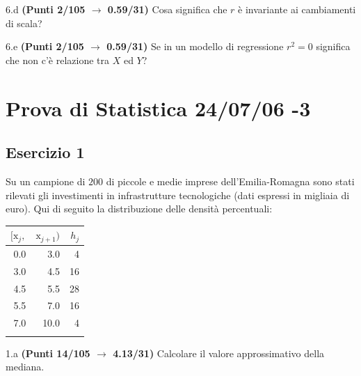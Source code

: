 \documentclass[
  11pt,
]{book}
\theoremstyle{mytheoremstyle}
\theoremstyle{mydefstyle}
\begin{document}
6.d \textbf{(Punti 2/105 \(\rightarrow\) 0.59/31)} Cosa significa che \(r\) è invariante ai cambiamenti di scala?

6.e \textbf{(Punti 2/105 \(\rightarrow\) 0.59/31)} Se in un modello di regressione \(r^2=0\) significa che non c'è relazione tra \(X\) ed \(Y\)?

\section{Prova di Statistica 24/07/06 -3}\label{prova-di-statistica-240706--3}

\subsection{Esercizio 1}\label{esercizio-1-43}

Su un campione di \(200\) di piccole e medie imprese dell'Emilia-Romagna sono stati rilevati gli investimenti in infrastrutture tecnologiche (dati espressi in migliaia di euro). Qui di seguito la distribuzione delle densità percentuali:

\begin{table}[H]
\centering
\begin{tabular}{rrr}
\toprule
$[\text{x}_j,$ & $\text{x}_{j+1})$ & $h_j$\\
\midrule
0.0 & 3.0 & 4\\
3.0 & 4.5 & 16\\
4.5 & 5.5 & 28\\
5.5 & 7.0 & 16\\
7.0 & 10.0 & 4\\
 &  & \\
\bottomrule
\end{tabular}
\end{table}

1.a \textbf{(Punti 14/105 \(\rightarrow\) 4.13/31)} Calcolare il valore approssimativo della mediana.
\end{document}
